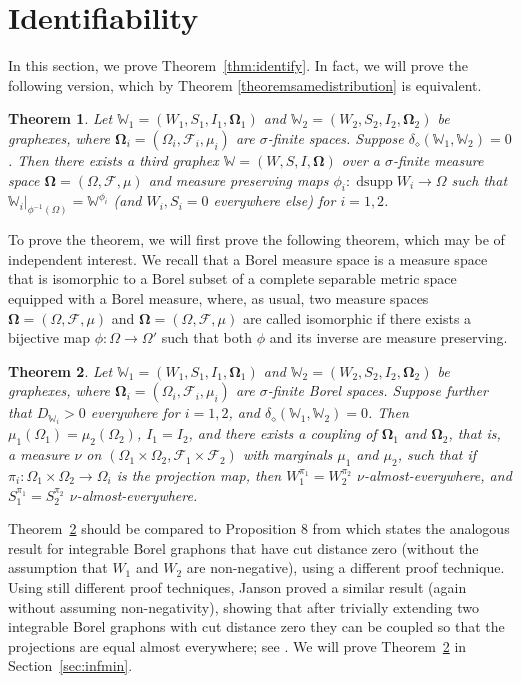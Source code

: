 \documentclass{amsart}
\numberwithin{equation}{section}
\numberwithin{figure}{section}
\newtheorem{theorem}{Theorem}[section]
\theoremstyle{definition}
\theoremstyle{remark}
\DeclareMathOperator{\dsupp}{dsupp}
\newcommand{\bOmega}{{\mathbf{\Omega}}}
\newcommand{\cW}{\mathbb{W}}
\newcommand{\cF}{\mathcal{F}}
\def\delGP{\delta_\diamond}
\begin{document}
\section{Identifiability}
\label{sec:idnetify}

In this section, we prove Theorem~\ref{thm:identify}. In fact, we will prove
the following version, which by Theorem \ref{theoremsamedistribution} is
equivalent.

\begin{theorem} \label{forwardequiv}
Let $\cW_1=(W_1,S_1,I_1,\bOmega_1)$ and $\cW_2=(W_2,S_2,I_2,\bOmega_2)$ be graphexes,
where $\bOmega_i=(\Omega_i,\cF_i,\mu_i)$ are $\sigma$-finite spaces.
Suppose $\delGP(\cW_1,\cW_2)=0$. Then there exists a third graphex
$\cW=(W,S,I,\bOmega)$ over a $\sigma$-finite measure space
$\bOmega=(\Omega,\cF,\mu)$ and measure preserving maps $\phi_i\colon
\dsupp W_i \rightarrow \Omega$ such that ${\cW_i}|_{\phi^{-1}(\Omega)}=\cW^{\phi_i}$ (and $W_i,S_i=0$ everywhere else) for $i=1,2$.
\end{theorem}

To prove the theorem, we will first prove the following theorem, which may be
of independent interest. We recall that a Borel measure space is a measure
space that is isomorphic to a Borel subset of a complete separable metric
space equipped with a Borel measure, where, as usual, two measure spaces
$\bOmega=(\Omega,\cF,\mu)$ and $\bOmega=(\Omega,\cF,\mu)$ are called
isomorphic if there exists a bijective map $\phi\colon\Omega\to\Omega'$ such
that both $\phi$ and its inverse are measure preserving.

\begin{theorem} \label{coupling}
Let $\cW_1=(W_1,S_1,I_1,\bOmega_1)$ and $\cW_2=(W_2,S_2,I_2,\bOmega_2)$ be
graphexes, where $\bOmega_i=(\Omega_i,\cF_i,\mu_i)$ are $\sigma$-finite Borel
spaces. Suppose further that $D_{\cW_i}>0$ everywhere for $i=1,2$, and
$\delGP(\cW_1,\cW_2)=0$. Then $\mu_1(\Omega_1)=\mu_2(\Omega_2)$, $I_1=I_2$,
and there exists a coupling of $\bOmega_1$ and $\bOmega_2$, that is, a
measure $\nu$ on $(\Omega_1 \times \Omega_2,\cF_1 \times \cF_2)$ with
marginals $\mu_1$ and $\mu_2$, such that if $\pi_i\colon \Omega_1 \times
\Omega_2 \rightarrow \Omega_i$ is the projection map, then
$W_1^{\pi_1}=W_2^{\pi_2}$ $\nu$-almost-everywhere, and
$S_1^{\pi_1}=S_2^{\pi_2}$ $\nu$-almost-everywhere.
\end{theorem}

Theorem~\ref{coupling} should be compared to Proposition 8 from \cite{BCCH16}
which states the analogous result for integrable Borel graphons that have cut
distance zero (without the assumption that $W_1$ and $W_2$ are non-negative),
using a different proof technique. Using still different proof techniques,
Janson proved a similar result (again without assuming non-negativity),
showing that after trivially extending two integrable Borel graphons with cut
distance zero they can be coupled so that the projections are equal almost
everywhere; see \cite{JANSON16}. We will prove Theorem~\ref{coupling} in
Section~\ref{sec:infmin}.
\end{document}
